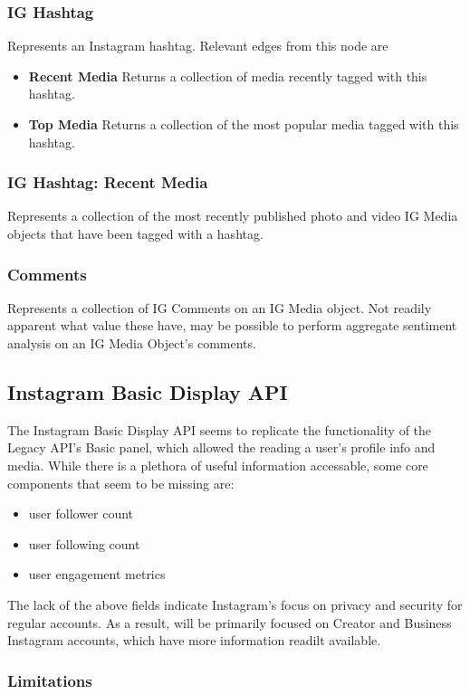 \subsubsection{IG Hashtag}
Represents an Instagram hashtag. Relevant edges from this node are
\begin{itemize}
    \item \textbf{Recent Media} Returns a collection of media recently tagged with this hashtag.
    \item \textbf{Top Media} Returns a collection of the most popular media tagged with this hashtag.
\end{itemize}

\subsubsection{IG Hashtag: Recent Media}
Represents a collection of the most recently published photo and video IG Media objects that have been tagged with a hashtag.

\subsubsection{Comments}
Represents a collection of IG Comments on an IG Media object. Not readily apparent what value these have,
may be possible to perform aggregate sentiment analysis on an IG Media Object's comments.

\subsection{Instagram Basic Display API}
The Instagram Basic Display API seems to replicate the functionality of the Legacy API's Basic panel, 
which allowed the reading a user's profile info and media. While there is a plethora of useful information accessable,
some core components that seem to be missing are:
\begin{itemize}
    \item user follower count
    \item user following count
    \item user engagement metrics
\end{itemize}
The lack of the above fields indicate Instagram's focus on privacy and security for regular accounts.
As a result, \serviceName will be primarily focused on Creator and Business Instagram accounts,
which have more information readilt available.
\subsubsection{Limitations}
